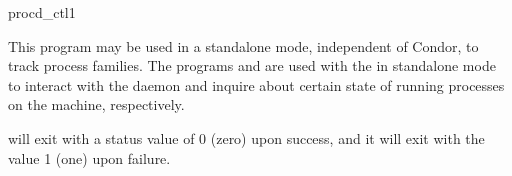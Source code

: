\begin{ManPage}{\label{man-procd-ctl}procd\_ctl}{1}
\begin{Options}
\end{Options}
	

\GenRem

This program may be used in a standalone mode, independent of
Condor, to track process families. The programs  and
 are used with the  in standalone mode
to interact with the daemon and inquire about certain state of running
processes on the machine, respectively.

\ExitStatus

 will exit with a status value of 0 (zero) upon success,
and it will exit with the value 1 (one) upon failure.

\end{ManPage}
